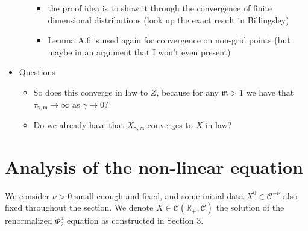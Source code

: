\documentclass{report}
\theoremstyle{remark}
\theoremstyle{definition}
\begin{document}
\begin{itemize}
\begin{enumerate}
    \begin{itemize}
      \item the proof idea is to show it through the convergence of finite dimensional distributions (look up the exact result in Billingsley)
      \item Lemma A.6 is used again for convergence on non-grid points (but maybe in an argument that I won't even present)
    \end{itemize}
  \end{enumerate}
  \item Questions
  \begin{itemize}
    \item So does this converge in law to $Z$, because for any $\mathfrak{m} >1$ we have that $\tau_{\gamma, \mathfrak{m}} \to \infty$ as $\gamma \to 0$?
    \item Do we already have that $X_{\gamma, \mathfrak{m}}$ converges to $X$ in law?
  \end{itemize}
\end{itemize}
\chapter{Analysis of the non-linear equation}
We consider $\nu > 0$ small enough and fixed, and some initial data $X^0 \in \mathcal{C}^{-\nu}$ also fixed throughout the section. We denote $X \in \mathcal{C}(\mathbb{R}_+, \mathcal{C})$ the solution of the renormalized $\Phi^4_2$ equation as constructed in Section 3.
\end{document}

